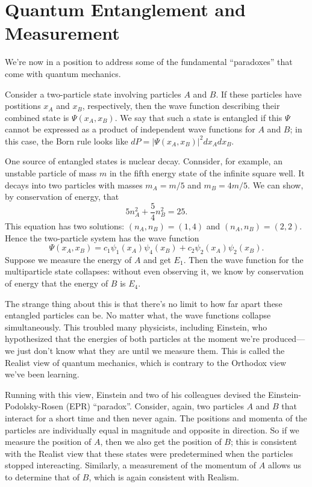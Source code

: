 \documentclass[../p052main.tex]{subfiles}
\begin{document}
\section{Quantum Entanglement and Measurement}
We're now in a position to address some of the fundamental ``paradoxes'' that come with quantum mechanics.

Consider a two-particle state involving particles $A$ and $B$.
If these particles have postitions $x_A$ and $x_B$, respectively, then the wave function describing their combined state is $\Psi(x_A, x_B)$.
We say that such a state is entangled if this $\Psi$ cannot be expressed as a product of independent wave functions for $A$ and $B$; in this case, the Born rule looks like $dP = |\Psi(x_A, x_B)|^2 dx_A dx_B$.

One source of entangled states is nuclear decay.
Connsider, for example, an unstable particle of mass $m$ in the fifth energy state of the infinite square well.
It decays into two particles with masses $m_A = m / 5$ and $m_B = 4m / 5$.
We can show, by conservation of energy, that
\[ 5n_A^2 + \frac{5}{4}n_B^2 = 25. \]
This equation has two solutions: $(n_A, n_B) = (1, 4)$ and $(n_A, n_B) = (2, 2)$.
Hence the two-particle system has the wave function
\[ \Psi(x_A, x_B) = c_1 \psi_1(x_A) \psi_4(x_B) + c_2 \psi_2(x_A) \psi_2(x_B). \]
Suppose we measure the energy of $A$ and get $E_1$.
Then the wave function for the multiparticle state collapses: without even observing it, we know by conservation of energy that the energy of $B$ is $E_4$.

The strange thing about this is that there's no limit to how far apart these entangled particles can be.
No matter what, the wave functions collapse simultaneously.
This troubled many physicists, including Einstein, who hypothesized that the energies of both particles at the moment we're produced---we just don't know what they are until we measure them.
This is called the Realist view of quantum mechanics, which is contrary to the Orthodox view we've been learning.

Running with this view, Einstein and two of his colleagues devised the Einstein-Podolsky-Rosen (EPR) ``paradox''.
Consider, again, two particles $A$ and $B$ that interact for a short time and then never again.
The positions and momenta of the particles are individually equal in magnitude and opposite in direction.
So if we measure the position of $A$, then we also get the position of $B$; this is consistent with the Realist view that these states were predetermined when the particles stopped intereacting.
Similarly, a measurement of the momentum of $A$ allows us to determine that of $B$, which is again consistent with Realism.
\end{document}
